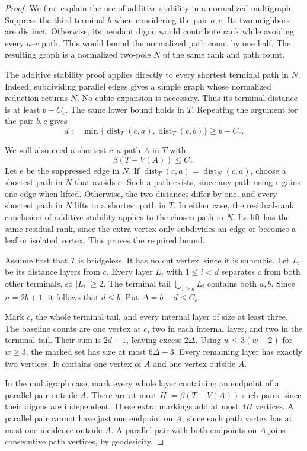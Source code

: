 \begin{proof}
We first explain the use of additive stability in a normalized multigraph.
Suppress the third terminal $b$ when considering the pair $a,c$.
Its two neighbors are distinct.
Otherwise, its pendant digon would contribute rank while avoiding every $a$--$c$ path.
This would bound the normalized path count by one half.
The resulting graph is a normalized two-pole $N$ of the same rank and path count.

The additive stability proof applies directly to every shortest terminal path in $N$.
Indeed, subdividing parallel edges gives a simple graph whose normalized reduction returns $N$.
No cubic expansion is necessary.
Thus its terminal distance is at least $b-C_\varepsilon$.
The same lower bound holds in $T$.
Repeating the argument for the pair $b,c$ gives
\[
 d:=\min\{\operatorname{dist}_T(c,a),\operatorname{dist}_T(c,b)\}
 \ge b-C_\varepsilon.
\]

We will also need a shortest $c$--$a$ path $A$ in $T$ with
\[
 \beta(T-V(A))\le C_\varepsilon.
\]
Let $e$ be the suppressed edge in $N$.
If $\operatorname{dist}_T(c,a)=\operatorname{dist}_N(c,a)$, choose a shortest path in $N$ that avoids $e$.
Such a path exists, since any path using $e$ gains one edge when lifted.
Otherwise, the two distances differ by one, and every shortest path in $N$ lifts to a shortest path in $T$.
In either case, the residual-rank conclusion of additive stability applies to the chosen path in $N$.
Its lift has the same residual rank, since the extra vertex only subdivides an edge or becomes a leaf or isolated vertex.
This proves the required bound.

Assume first that $T$ is bridgeless.
It has no cut vertex, since it is subcubic.
Let $L_i$ be its distance layers from $c$.
Every layer $L_i$ with $1\le i<d$ separates $c$ from both other terminals, so $|L_i|\ge2$.
The terminal tail $\bigcup_{i\ge d}L_i$ contains both $a,b$.
Since $n=2b+1$, it follows that $d\le b$.
Put $\Delta=b-d\le C_\varepsilon$.

Mark $c$, the whole terminal tail, and every internal layer of size at least three.
The baseline counts are one vertex at $c$, two in each internal layer, and two in the terminal tail.
Their sum is $2d+1$, leaving excess $2\Delta$.
Using $w\le3(w-2)$ for $w\ge3$, the marked set has size at most $6\Delta+3$.
Every remaining layer has exactly two vertices.
It contains one vertex of $A$ and one vertex outside $A$.

In the multigraph case, mark every whole layer containing an endpoint of a parallel pair outside $A$.
There are at most $H:=\beta(T-V(A))$ such pairs, since their digons are independent.
These extra markings add at most $4H$ vertices.
A parallel pair cannot have just one endpoint on $A$, since each path vertex has at most one incidence outside $A$.
A parallel pair with both endpoints on $A$ joins consecutive path vertices, by geodesicity.


\end{proof}
